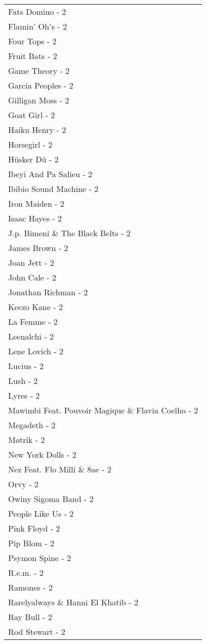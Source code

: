 \documentclass[
]{article}
\begin{document}
\begin{longtable}{l}
Fats Domino - 2 \\ 
Flamin' Oh's - 2 \\ 
Four Tops - 2 \\ 
Fruit Bats - 2 \\ 
Game Theory - 2 \\ 
Garcia Peoples - 2 \\ 
Gilligan Moss - 2 \\ 
Goat Girl - 2 \\ 
Haiku Henry - 2 \\ 
Horsegirl - 2 \\ 
Hüsker Dü - 2 \\ 
Ibeyi And Pa Salieu - 2 \\ 
Ibibio Sound Machine - 2 \\ 
Iron Maiden - 2 \\ 
Isaac Hayes - 2 \\ 
J.p. Bimeni \& The Black Belts - 2 \\ 
James Brown - 2 \\ 
Joan Jett - 2 \\ 
John Cale - 2 \\ 
Jonathan Richman - 2 \\ 
Keezo Kane - 2 \\ 
La Femme - 2 \\ 
Leenalchi - 2 \\ 
Lene Lovich - 2 \\ 
Lucius - 2 \\ 
Lush - 2 \\ 
Lyres - 2 \\ 
Mawimbi Feat. Pouvoir Magique \& Flavia Coelho - 2 \\ 
Megadeth - 2 \\ 
Møtrik - 2 \\ 
New York Dolls - 2 \\ 
Nez Feat. Flo Milli \& 8ae - 2 \\ 
Orvy - 2 \\ 
Owiny Sigoma Band - 2 \\ 
People Like Us - 2 \\ 
Pink Floyd - 2 \\ 
Pip Blom - 2 \\ 
Psymon Spine - 2 \\ 
R.e.m. - 2 \\ 
Ramones - 2 \\ 
Rarelyalways \& Hanni El Khatib - 2 \\ 
Ray Bull - 2 \\ 
Rod Stewart - 2 \\ 

\end{longtable}
\end{document}
